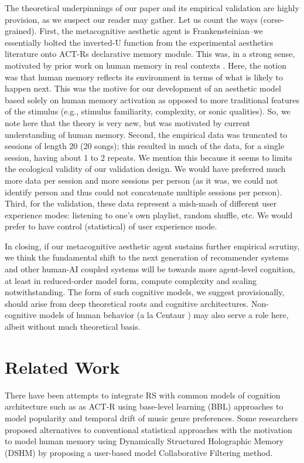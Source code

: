 \documentclass[letterpaper]{article} %
\begin{document}
The theoretical underpinnings of our paper and its empirical validation are highly provision, as we suspect our reader may gather.  Let us count the ways (corse-grained).  First, the metacognitive aesthetic agent is Frankensteinian--we essentially bolted the inverted-U function from the experimental aesthetics literature onto ACT-Rs declarative memory module.  This was, in a strong sense, motivated by prior work on human memory in real contexts \cite{AndersonSchooler1991}. Here, the notion was that human memory reflects its environment in terms of what is likely to happen next.  This was the motive for our development of an aesthetic model based solely on human memory activation as opposed to more traditional features of the stimulus (e.g., stimulus familiarity, complexity, or sonic qualities).  So, we note here that the theory is very new, but was motivated by current understanding of human memory.  Second, the empirical data was truncated to sessions of length 20 (20 songs); this resulted in much of the data, for a single session, having about 1 to 2 repeats.  We mention this because it seems to limits the ecological validity of our validation design.  We would have preferred much more data per session and more sessions per person (as it was, we could not identify person and thus could not concatenate multiple sessions per person).  Third, for the validation, these data represent a mish-mash of different user experience modes: listening to one's own playlist, random shuffle, etc.  We would prefer to have control (statistical) of user experience mode. 

In closing, if our metacognitive aesthetic agent sustains further empirical scrutiny, we think the fundamental shift to the next generation of recommender systems and other human-AI coupled systems will be towards more agent-level cognition, at least in reduced-order model form, compute complexity and scaling notwithstanding.  The form of such cognitive models, we suggest provisionally, should arise from deep theoretical roots and cognitive architectures.  Non-cognitive models of human behavior (a la Centaur \cite{BinzEtal2025}) may also serve a role here, albeit without much theoretical basis.

\section{Related Work}
There have been attempts to integrate RS with common models of cognition architecture such as as ACT-R using base-level learning (BBL) approaches to model popularity and temporal drift of music genre preferences. \cite{Lex2020BLL} Some researchers proposed alternatives to conventional statistical approaches with the motivation to model human memory using Dynamically Structured Holographic Memory (DSHM) by proposing a user-based model Collaborative Filtering method. \cite{4746700}





\end{document}
